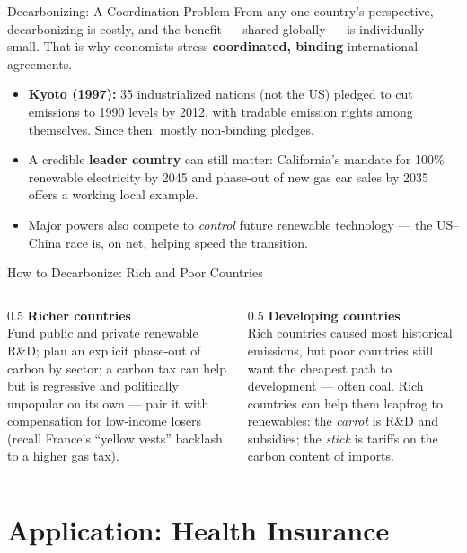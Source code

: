 \documentclass[11pt,aspectratio=169]{beamer}
\begin{document}
\begin{frame}{Decarbonizing: A Coordination Problem}
  From any one country's perspective, decarbonizing is costly, and the benefit --- shared globally --- is individually small. That is why economists stress \textbf{coordinated, binding} international agreements.
  \begin{itemize}
    \item \textbf{Kyoto (1997):} 35 industrialized nations (not the US) pledged to cut emissions to 1990 levels by 2012, with tradable emission rights among themselves. Since then: mostly non-binding pledges.
    \item A credible \textbf{leader country} can still matter: California's mandate for 100\% renewable electricity by 2045 and phase-out of new gas car sales by 2035 offers a working local example.
    \item Major powers also compete to \emph{control} future renewable technology --- the US--China race is, on net, helping speed the transition.
  \end{itemize}
\end{frame}

\begin{frame}{How to Decarbonize: Rich and Poor Countries}
  \begin{columns}[T]
    \begin{column}{0.5\textwidth}
      \textbf{Richer countries}\\
      \small Fund public and private renewable R\&D; plan an explicit phase-out of carbon by sector; a carbon tax can help but is regressive and politically unpopular on its own --- pair it with compensation for low-income losers (recall France's ``yellow vests'' backlash to a higher gas tax).
    \end{column}
    \begin{column}{0.5\textwidth}
      \textbf{Developing countries}\\
      \small Rich countries caused most historical emissions, but poor countries still want the cheapest path to development --- often coal. Rich countries can help them leapfrog to renewables: the \emph{carrot} is R\&D and subsidies; the \emph{stick} is tariffs on the carbon content of imports.
    \end{column}
  \end{columns}
\end{frame}

\section{Application: Health Insurance}
\end{document}
